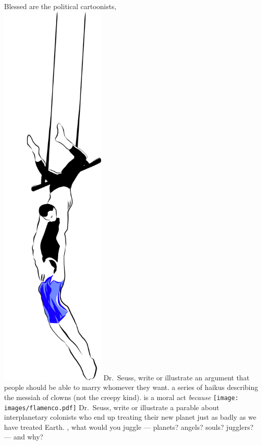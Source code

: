 \bverse Blessed are the political cartoonists, \\
\newpage
\hfill\includegraphics[width=2in]{images/duo_trapeze.pdf}
\newpage%
\bversenonum {} Dr.~Seuss, write or illustrate an argument that people should be able to marry whomever they want.
\newpage%
\bversenonum {} a series of haikus describing the messiah of clowns (not the creepy kind).
\newpage%
\bversenonum {} is a moral act \textit{because}
\newpage
\hfill\texttt{[image: images/flamenco.pdf]}
\newpage%
\bversenonum {} Dr.~Seuss, write or illustrate a parable about interplanetary colonists who end up treating their new planet just as badly as we have treated Earth.
\newpage%
\bversenonum {}, what would you juggle --- planets? angels? souls? jugglers? --- and why?
